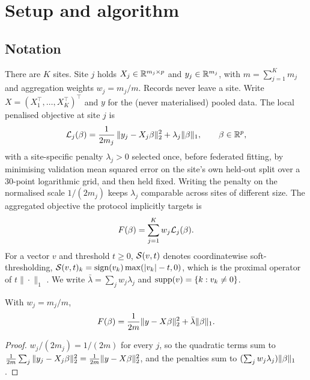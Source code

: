 \section{Setup and algorithm}
\label{sec:setup}

\subsection{Notation}

There are $K$ sites. Site $j$ holds $X_j \in \mathbb{R}^{m_j \times p}$ and
$y_j \in \mathbb{R}^{m_j}$, with $m = \sum_{j=1}^K m_j$ and aggregation weights
$w_j = m_j / m$. Records never leave a site. Write
$X = (X_1^\top, \dots, X_K^\top)^\top$ and $y$ for the (never materialised)
pooled data. The local penalised objective at site $j$ is
\begin{equation}
\mathcal{L}_j(\beta)
 = \frac{1}{2 m_j}\, \| y_j - X_j \beta \|_2^2 + \lambda_j \|\beta\|_1 ,
\qquad \beta \in \mathbb{R}^p ,
\label{eq:local}
\end{equation}
with a site-specific penalty $\lambda_j > 0$ selected once, before
federated fitting, by minimising validation mean squared error on the
site's own held-out split over a $30$-point logarithmic grid, and then held
fixed. Writing the penalty on the normalised scale $1/(2m_j)$ keeps
$\lambda_j$ comparable across sites of different size. The aggregated
objective the protocol implicitly targets is
\begin{equation}
F(\beta) = \sum_{j=1}^K w_j \mathcal{L}_j(\beta) .
\label{eq:global}
\end{equation}
For a vector $v$ and threshold $t \ge 0$, $\mathcal{S}(v, t)$ denotes coordinatewise
soft-thresholding, $\mathcal{S}(v,t)_k = \operatorname{sign}(v_k)\max(|v_k| - t, 0)$, which is the
proximal operator of $t\|\cdot\|_1$ \citep{parikh2014}. We write
$\bar\lambda = \sum_j w_j \lambda_j$ and $\operatorname{supp}(v) = \{k : v_k \neq 0\}$.

\begin{lemma}
\label{lem:pooled}
With $w_j = m_j/m$,
\[
F(\beta)
 = \frac{1}{2m} \| y - X\beta \|_2^2 + \bar\lambda \|\beta\|_1 .
\]
\end{lemma}

\begin{proof}
$w_j / (2m_j) = 1/(2m)$ for every $j$, so the quadratic terms sum to
$\frac{1}{2m}\sum_j \|y_j - X_j\beta\|_2^2 = \frac{1}{2m}\|y - X\beta\|_2^2$,
and the penalties sum to $(\sum_j w_j \lambda_j)\|\beta\|_1$.
\end{proof}


